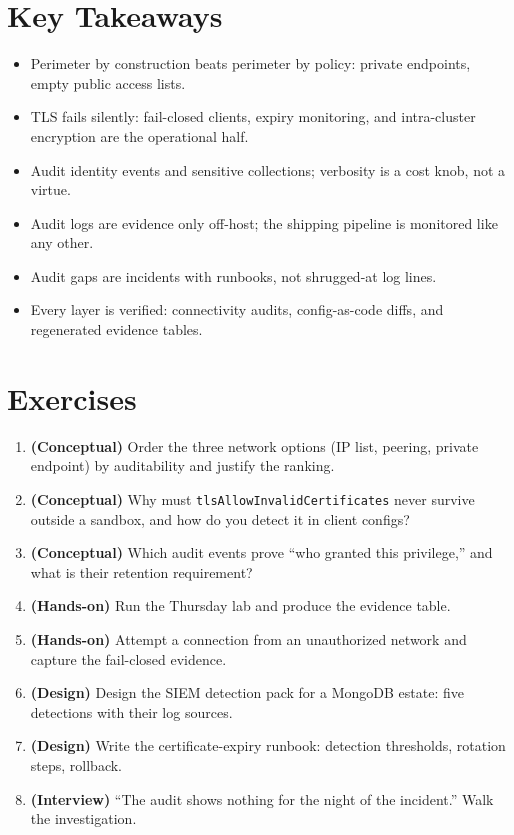 \section*{Key Takeaways}
\begin{itemize}
    \item Perimeter by construction beats perimeter by policy: private endpoints, empty public access lists.
    \item TLS fails silently: fail-closed clients, expiry monitoring, and intra-cluster encryption are the operational half.
    \item Audit identity events and sensitive collections; verbosity is a cost knob, not a virtue.
    \item Audit logs are evidence only off-host; the shipping pipeline is monitored like any other.
    \item Audit gaps are incidents with runbooks, not shrugged-at log lines.
    \item Every layer is verified: connectivity audits, config-as-code diffs, and regenerated evidence tables.
\end{itemize}

\section{Exercises}
\begin{enumerate}
    \item \textbf{(Conceptual)} Order the three network options (IP list, peering, private endpoint) by auditability and justify the ranking.
    \item \textbf{(Conceptual)} Why must \texttt{tlsAllowInvalidCertificates} never survive outside a sandbox, and how do you detect it in client configs?
    \item \textbf{(Conceptual)} Which audit events prove ``who granted this privilege,'' and what is their retention requirement?
    \item \textbf{(Hands-on)} Run the Thursday lab and produce the evidence table.
    \item \textbf{(Hands-on)} Attempt a connection from an unauthorized network and capture the fail-closed evidence.
    \item \textbf{(Design)} Design the SIEM detection pack for a MongoDB estate: five detections with their log sources.
    \item \textbf{(Design)} Write the certificate-expiry runbook: detection thresholds, rotation steps, rollback.
    \item \textbf{(Interview)} ``The audit shows nothing for the night of the incident.'' Walk the investigation.
\end{enumerate}

